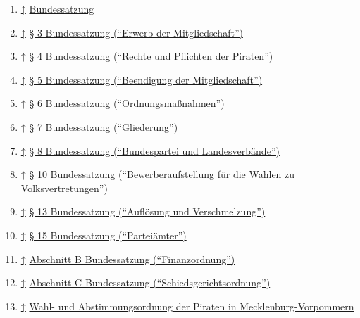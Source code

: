 \begin{enumerate}
\item
  \href{\#cite\_ref-0}{↑} \href{/Bundessatzung}{Bundessatzung}
\item
  \href{\#cite\_ref-1}{↑}
  \href{/Bundessatzung\#.C2.A7\_3\_-\_Erwerb\_der\_Mitgliedschaft}{§ 3
  Bundessatzung (``Erwerb der Mitgliedschaft'')}
\item
  \href{\#cite\_ref-2}{↑}
  \href{/Bundessatzung\#.C2.A7\_4\_-\_Rechte\_und\_Pflichten\_der\_Piraten}{§
  4 Bundessatzung (``Rechte und Pflichten der Piraten'')}
\item
  \href{\#cite\_ref-3}{↑}
  \href{/Bundessatzung\#.C2.A7\_5\_-\_Beendigung\_der\_Mitgliedschaft}{§
  5 Bundessatzung (``Beendigung der Mitgliedschaft'')}
\item
  \href{\#cite\_ref-4}{↑}
  \href{/Bundessatzung\#.C2.A7\_6\_-\_Ordnungsma.C3.9Fnahmen}{§ 6
  Bundessatzung (``Ordnungsmaßnahmen'')}
\item
  \href{\#cite\_ref-5}{↑}
  \href{/Bundessatzung\#.C2.A7\_7\_-\_Gliederung}{§ 7 Bundessatzung
  (``Gliederung'')}
\item
  \href{\#cite\_ref-6}{↑}
  \href{/Bundessatzung\#.C2.A7\_8\_-\_Bundespartei\_und\_Landesverb.C3.A4nde}{§
  8 Bundessatzung (``Bundespartei und Landesverbände'')}
\item
  \href{\#cite\_ref-7}{↑}
  \href{/Bundessatzung\#.C2.A7\_10\_-\_Bewerberaufstellung\_f.C3.BCr\_die\_Wahlen\_zu\_Volksvertretungen}{§
  10 Bundessatzung (``Bewerberaufstellung für die Wahlen zu
  Volksvertretungen'')}
\item
  \href{\#cite\_ref-8}{↑}
  \href{/Bundessatzung\#.C2.A7\_13\_-\_Aufl.C3.B6sung\_und\_Verschmelzung}{§
  13 Bundessatzung (``Auflösung und Verschmelzung'')}
\item
  \href{\#cite\_ref-9}{↑}
  \href{/Bundessatzung\#.C2.A7\_15\_-\_Partei.C3.A4mter}{§ 15
  Bundessatzung (``Parteiämter'')}
\item
  \href{\#cite\_ref-10}{↑}
  \href{/Bundessatzung\#Abschnitt\_B:\_Finanzordnung}{Abschnitt B
  Bundessatzung (``Finanzordnung'')}
\item
  \href{\#cite\_ref-11}{↑}
  \href{/Bundessatzung\#Abschnitt\_C:\_Schiedsgerichtsordnung}{Abschnitt
  C Bundessatzung (``Schiedsgerichtsordnung'')}
\item
  \href{\#cite\_ref-12}{↑} \href{/MV:Wahlordnung}{Wahl- und
  Abstimmungsordnung der Piraten in Mecklenburg-Vorpommern}
\end{enumerate}
